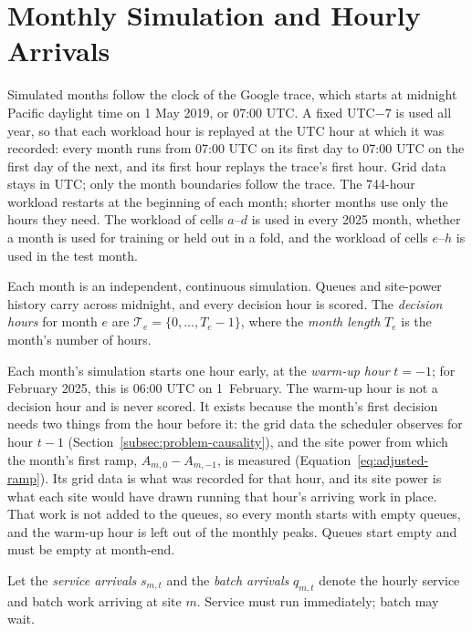 \documentclass{UNCC-thesis}
\begin{document}
\section{Monthly Simulation and Hourly Arrivals}
\label{subsec:transform-pairing}

Simulated months follow the clock of the Google trace, which starts at
midnight Pacific daylight time on 1 May 2019, or 07:00 UTC. A fixed UTC\(-7\)
is used all year, so that each workload hour is replayed at the UTC hour
at which it was recorded: every month runs from 07:00 UTC on its first day
to 07:00 UTC on the first day of the next, and its first hour replays the
trace's first hour. Grid data stays in UTC; only the month boundaries
follow the trace. The 744-hour workload restarts at the beginning of each
month; shorter months use only the hours they need. The workload of cells
\(a\)--\(d\) is used in every 2025 month, whether a month is used for training
or held out in a fold, and the workload of cells \(e\)--\(h\) is used in the
test month.

Each month is an independent, continuous simulation. Queues and site-power
history carry across midnight, and every decision hour is scored. The
\emph{decision hours} for month \(e\) are \(\mathcal T_e=\{0,\ldots,T_e-1\}\),
where the \emph{month length} \(T_e\) is the month's number of hours.

Each month's simulation starts one hour early, at the \emph{warm-up hour}
\(t=-1\); for February 2025, this is 06:00 UTC on 1~February. The
warm-up hour is not a decision hour and is never scored. It exists because
the month's first decision needs two things from the hour before it: the
grid data the scheduler observes for hour \(t-1\)
(Section~\ref{subsec:problem-causality}), and the site power from which the
month's first ramp, \(A_{m,0}-A_{m,-1}\), is measured
(Equation~\eqref{eq:adjusted-ramp}). Its grid data is what was recorded
for that hour, and its site power is what each site would have drawn running
that hour's arriving work in place. That work is not added to the queues, so
every month starts with empty queues, and the warm-up hour is left out of the
monthly peaks. Queues start empty and must be empty at month-end. 

Let the \emph{service arrivals} \(s_{m,t}\) and the \emph{batch arrivals}
\(q_{m,t}\) denote the hourly service and batch work arriving at site \(m\).
Service must run immediately; batch may wait.
\end{document}

